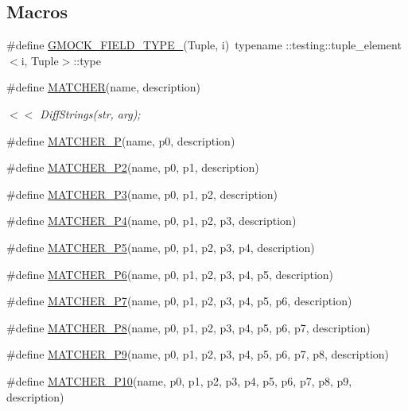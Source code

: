 \subsection*{Macros}
\begin{DoxyCompactItemize}
\item 
\#define \hyperlink{gmock-generated-matchers_8h_acf3e27de83a73f0d873da1cd471e505b}{G\+M\+O\+C\+K\+\_\+\+F\+I\+E\+L\+D\+\_\+\+T\+Y\+P\+E\+\_\+}(Tuple,  i)~typename \+::testing\+::tuple\+\_\+element$<$i, Tuple$>$\+::type
\item 
\#define \hyperlink{gmock-generated-matchers_8h_af4fe73ff8e2b0494f4970b575b65ddff}{M\+A\+T\+C\+H\+ER}(name,  description)
\begin{DoxyCompactList}\small\item\em $<$$<$ Diff\+Strings(str, arg); \end{DoxyCompactList}\item 
\#define \hyperlink{gmock-generated-matchers_8h_acb7ae915efa2fd8d3f6ea7313198afb6}{M\+A\+T\+C\+H\+E\+R\+\_\+P}(name,  p0,  description)
\item 
\#define \hyperlink{gmock-generated-matchers_8h_a78efce3ad21c8f68223f5c2d09f2e79d}{M\+A\+T\+C\+H\+E\+R\+\_\+\+P2}(name,  p0,  p1,  description)
\item 
\#define \hyperlink{gmock-generated-matchers_8h_a507103c6251f8bf4393ec119d9e34d34}{M\+A\+T\+C\+H\+E\+R\+\_\+\+P3}(name,  p0,  p1,  p2,  description)
\item 
\#define \hyperlink{gmock-generated-matchers_8h_a6ec420ed6bc3ad073f19a4e32dd1f38f}{M\+A\+T\+C\+H\+E\+R\+\_\+\+P4}(name,  p0,  p1,  p2,  p3,  description)
\item 
\#define \hyperlink{gmock-generated-matchers_8h_a3a9589cd79e2dbdb4e09981510c9c42e}{M\+A\+T\+C\+H\+E\+R\+\_\+\+P5}(name,  p0,  p1,  p2,  p3,  p4,  description)
\item 
\#define \hyperlink{gmock-generated-matchers_8h_aceda758bb064965b2b9a7e0e96085861}{M\+A\+T\+C\+H\+E\+R\+\_\+\+P6}(name,  p0,  p1,  p2,  p3,  p4,  p5,  description)
\item 
\#define \hyperlink{gmock-generated-matchers_8h_a2948ce54387a83c33fa98ba0c73eb11f}{M\+A\+T\+C\+H\+E\+R\+\_\+\+P7}(name,  p0,  p1,  p2,  p3,  p4,  p5,  p6,  description)
\item 
\#define \hyperlink{gmock-generated-matchers_8h_ad86c95b03df37fada38e18d8eb9e53bc}{M\+A\+T\+C\+H\+E\+R\+\_\+\+P8}(name,  p0,  p1,  p2,  p3,  p4,  p5,  p6,  p7,  description)
\item 
\#define \hyperlink{gmock-generated-matchers_8h_a2dc1db146d4112c9fde1c2708807e43e}{M\+A\+T\+C\+H\+E\+R\+\_\+\+P9}(name,  p0,  p1,  p2,  p3,  p4,  p5,  p6,  p7,  p8,  description)
\item 
\#define \hyperlink{gmock-generated-matchers_8h_aa6a3925eeb8bcb4b6b3465cc4ff26650}{M\+A\+T\+C\+H\+E\+R\+\_\+\+P10}(name,  p0,  p1,  p2,  p3,  p4,  p5,  p6,  p7,  p8,  p9,  description)
\end{DoxyCompactItemize}
